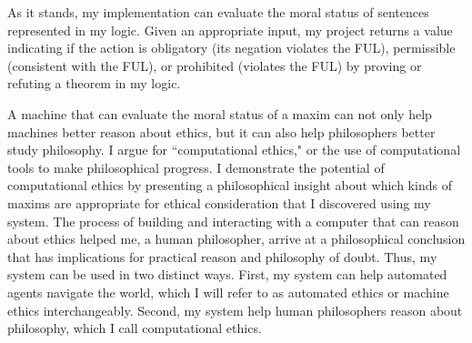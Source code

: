 \begin{isabellebody}
\begin{isamarkuptext}
As it stands, my implementation can evaluate the moral status of sentences represented in my logic. 
Given an appropriate input, my project returns a value indicating if the action is obligatory 
(its negation violates the FUL), permissible (consistent with the FUL), or prohibited (violates the FUL) 
by proving or refuting a theorem in my logic. 

A machine that can evaluate the moral status of a maxim can not only help machines better reason about ethics, 
but it can also help philosophers 
better study philosophy. I argue for ``computational ethics," or the use of computational tools to 
make philosophical progress. I demonstrate the potential of computational ethics by presenting a 
philosophical insight about which kinds of maxims are appropriate for ethical consideration that I 
discovered using my system. The process of building and interacting with a computer that can reason 
about ethics helped me, a human philosopher, arrive at a philosophical conclusion that has implications for practical
reason and philosophy of doubt. Thus, my system can be used in two distinct ways. First, my system can help
automated agents navigate the world, which I will refer to as automated ethics or machine ethics interchangeably. Second, 
my system help human philosophers reason about philosophy, which I call computational ethics.%
\end{isamarkuptext}\isamarkuptrue%
%
\isadelimtheory
%
\endisadelimtheory
%
\isatagtheory
%
\endisatagtheory
{\isafoldtheory}%
%
\isadelimtheory
%
\endisadelimtheory
%
\end{isabellebody}%
\endinput
